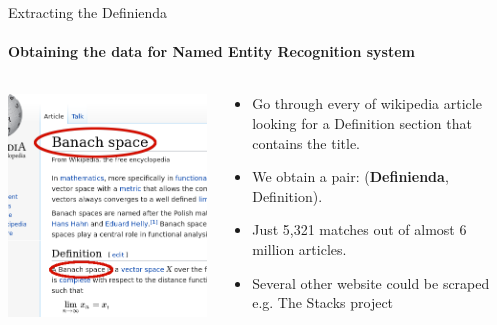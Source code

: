 \documentclass{beamer}
\begin{document}
\begin{frame}{Extracting the Definienda}
    \framesubtitle{Obtaining the data for Named Entity Recognition system}
    \begin{columns}[T]
        \begin{column}{0.5\textwidth}
    \includegraphics[width=\textwidth]{wiki_thin_banach.png}
        \end{column}
        \begin{column}{0.5\textwidth}
            \begin{itemize}
            \item Go through every of wikipedia article looking for a Definition section that contains the title.
            \item We obtain a pair: (\textbf{Definienda},  Definition).
            \item Just 5,321 matches out of almost 6 million articles.
            \item Several other website could be scraped e.g. The Stacks project
            \end{itemize}
        \end{column}
    \end{columns}
\end{frame}
\end{document}
